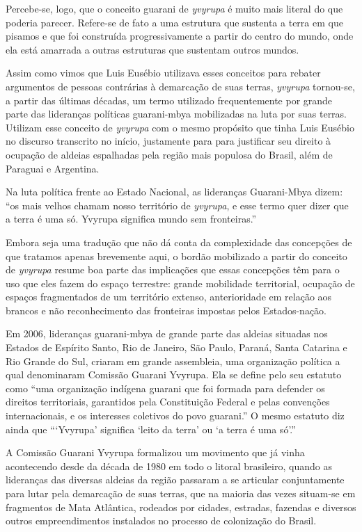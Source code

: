 Percebe-se, logo, que o conceito guarani de \emph{yvyrupa} é muito mais literal
do que poderia parecer. Refere-se de fato a uma estrutura que sustenta
a terra em que pisamos e que foi construída progressivamente a partir
do centro do mundo, onde ela está amarrada a outras estruturas que
sustentam outros mundos.

Assim como vimos que Luis Eusébio utilizava esses conceitos para rebater
argumentos de pessoas contrárias à demarcação de suas terras, \emph{yvyrupa}
tornou-se, a partir das últimas décadas, um termo utilizado
frequentemente por grande parte das lideranças políticas guarani-mbya
mobilizadas na luta por suas terras. Utilizam esse conceito de \emph{yvyrupa}
com o mesmo propósito que tinha Luis Eusébio no discurso transcrito no 
início, justamente para para justificar seu direito à ocupação de
aldeias espalhadas pela região mais populosa do Brasil, além de
Paraguai e Argentina.

Na luta política frente ao Estado Nacional, as lideranças Guarani-Mbya
dizem: ``os mais velhos chamam nosso território de \emph{yvyrupa}, e esse termo
quer dizer que a terra é uma só. Yvyrupa significa mundo sem
fronteiras.''

Embora seja uma tradução que não dá conta da complexidade das concepções
de que tratamos apenas brevemente aqui, o bordão mobilizado a partir do
conceito de \emph{yvyrupa} resume boa parte das implicações que essas
concepções têm para o uso que eles fazem do espaço terrestre: grande
mobilidade territorial, ocupação de espaços fragmentados de um
território extenso, anterioridade em relação aos brancos e não
reconhecimento das fronteiras impostas pelos Estados-nação.

Em 2006, lideranças guarani-mbya de grande parte das aldeias situadas
nos Estados de Espírito Santo, Rio de Janeiro, São Paulo, Paraná, Santa
Catarina e Rio Grande do Sul, criaram em grande assembleia, uma
organização política a qual denominaram Comissão Guarani Yvyrupa. Ela
se define pelo seu estatuto como ``uma organização indígena guarani que
foi formada para defender os direitos territoriais, garantidos pela
Constituição Federal e pelas convenções internacionais, e os interesses
coletivos do povo guarani.'' O mesmo estatuto diz ainda que ``‘Yvyrupa’ 
significa ‘leito da terra’ ou ‘a terra é uma só’.''

A Comissão Guarani Yvyrupa formalizou um movimento que já vinha
acontecendo desde da década de 1980 em todo o litoral brasileiro,
quando as lideranças das diversas aldeias da região passaram a se
articular conjuntamente para lutar pela demarcação de suas terras, que
na maioria das vezes situam-se em fragmentos de Mata Atlântica,
rodeados por cidades, estradas, fazendas e diversos outros
empreendimentos instalados no processo de colonização do Brasil.

